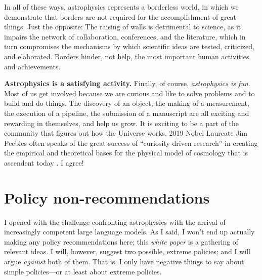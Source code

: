 \documentclass{article}
\newcommand{\documentname}{\textsl{white paper}}
\newcommand{\paragraphskip}{\medskip}
\renewcommand{\paragraph}[1]{\par\paragraphskip\noindent\textbf{#1}}
\begin{document}
In all of these ways, astrophysics represents a borderless world, in which we demonstrate that borders are not required for the accomplishment of great things.
Just the opposite: The raising of walls is detrimental to science, as it impairs the network of collaboration, conferences, and the literature, which in turn compromises the mechanisms by which scientific ideas are tested, criticized, and elaborated.
Borders hinder, not help, the most important human activities and achievements.

\paragraph{Astrophysics is a satisfying activity.}
Finally, of course, \emph{astrophysics is fun}.
Most of us get involved because we are curious and like to solve problems and to build and do things.
The discovery of an object, the making of a measurement, the execution of a pipeline, the submission of a manuscript are all exciting and rewarding in themselves, and help us grow.
It is exciting to be a part of the community that figures out how the Universe works.
2019 Nobel Laureate Jim Peebles often speaks of the great success of ``curiosity-driven research'' in creating the empirical and theoretical bases for the physical model of cosmology that is ascendent today \cite{curiosity}.
I agree!

\section{Policy non-recommendations}\label{sec:policy}
I opened with the challenge confronting astrophysics with the arrival of increasingly competent large language models.
As I said, I won't end up actually making any policy recommendations here; this \documentname{} is a gathering of relevant ideas.
I will, however, suggest two possible, extreme policies; and I will argue \emph{against} both of them.
That is, I only have negative things to say about simple policies---or at least about extreme policies.
\end{document}
